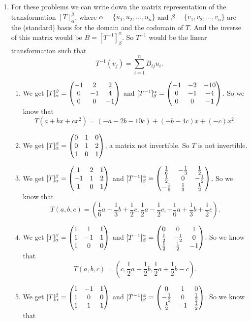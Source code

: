 \begin{enumerate}
\begin{enumerate}
\end{enumerate}
\item For these problems we can write down the matrix representation of the transformation $[T]_{\alpha }^{\beta}$, where $\alpha=\{u_1,u_2,\ldots ,u_n\}$ and $\beta=\{v_1,v_2,\ldots ,v_n\}$ are the (standard) basis for the domain and the codomain of $T$. And the inverse of this matrix would be $B=[T^{-1}]_{\beta}^{\alpha}$. So $T^{-1}$ would be the linear transformation such that \[T^{-1}(v_j)=\sum_{i=1}^n{B_{ij}u_i}.\]
\begin{enumerate}
\item We get $[T]_{\alpha}^{\beta}=\begin{pmatrix}-1 & 2 & 2\cr 0 & -1 & 4\cr 0 & 0 & -1\end{pmatrix}$ and $[T^{-1}]_{\beta}^{\alpha}=\begin{pmatrix}-1 & -2 & -10\cr 0 & -1 & -4\cr 0 & 0 & -1\end{pmatrix}$. So we know that 
\[T(a+bx+cx^2)=(-a-2b-10c)+(-b-4c)x+(-c)x^2.\]
\item We get $[T]_{\alpha}^{\beta}=\begin{pmatrix}0 & 1 & 0\cr 0 & 1 & 2\cr 1 & 0 & 1\end{pmatrix}$, a matrix not invertible. So $T$ is not invertible.
\item We get $[T]_{\alpha}^{\beta}=\begin{pmatrix}1 & 2 & 1\cr -1 & 1 & 2\cr 1 & 0 & 1\end{pmatrix}$ and $[T^{-1}]_{\beta}^{\alpha}=\begin{pmatrix}\frac{1}{6} & -\frac{1}{3} & \frac{1}{2}\cr \frac{1}{2} & 0 & -\frac{1}{2}\cr -\frac{1}{6} & \frac{1}{3} & \frac{1}{2}\end{pmatrix}$. So we know that 
\[T(a,b,c)=(\frac{1}{6}a-\frac{1}{3}b+\frac{1}{2}c,\frac{1}{2}a-\frac{1}{2}c,-\frac{1}{6}a+\frac{1}{3}b+\frac{1}{2}c).\]
\item We get $[T]_{\alpha}^{\beta}=\begin{pmatrix}1 & 1 & 1\cr 1 & -1 & 1\cr 1 & 0 & 0\end{pmatrix}$ and $[T^{-1}]_{\beta}^{\alpha}=\begin{pmatrix}0 & 0 & 1\cr \frac{1}{2} & -\frac{1}{2} & 0\cr \frac{1}{2} & \frac{1}{2} & -1\end{pmatrix}$. So we know that 
\[T(a,b,c)=(c,\frac{1}{2}a-\frac{1}{2}b,\frac{1}{2}a+\frac{1}{2}b-c).\]
\item We get $[T]_{\alpha}^{\beta}=\begin{pmatrix}1 & -1 & 1\cr 1 & 0 & 0\cr 1 & 1 & 1\end{pmatrix}$ and $[T^{-1}]_{\beta}^{\alpha}=\begin{pmatrix}0 & 1 & 0\cr -\frac{1}{2} & 0 & \frac{1}{2}\cr \frac{1}{2} & -1 & \frac{1}{2}\end{pmatrix}$. So we know that 

\end{enumerate}
\end{enumerate}
